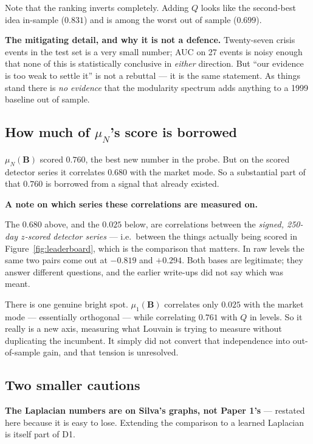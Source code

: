\documentclass[11pt,a4paper]{article}
\newcommand{\Q}{Q}
\newcommand{\Bmat}{\mathbf{B}}
\newenvironment{aside}[1]
 {\par\vspace{2.5mm}\begin{lrbox}{\asidebox}%
  \begin{minipage}{\dimexpr\textwidth-16pt\relax}\small\textbf{#1}\par\vspace{1mm}}
 {\end{minipage}\end{lrbox}%
  \noindent\setlength{\fboxsep}{7pt}\setlength{\fboxrule}{.4pt}%
  \fcolorbox{Rule}{Panel2}{\usebox{\asidebox}}\par\vspace{2.5mm}}
\begin{document}
Note that the ranking inverts completely. Adding $\Q$ looks like the second-best
idea in-sample ($0.831$) and is among the worst out of sample ($0.699$).

\textbf{The mitigating detail, and why it is not a defence.} Twenty-seven crisis
events in the test set is a very small number; AUC on 27 events is noisy enough
that none of this is statistically conclusive in \emph{either} direction. But
``our evidence is too weak to settle it'' is not a rebuttal --- it is the same
statement. As things stand there is \emph{no evidence} that the modularity
spectrum adds anything to a 1999 baseline out of sample.

\subsection{How much of \texorpdfstring{$\mu_N$}{mu\_N}'s score is borrowed}

$\mu_N(\Bmat)$ scored $0.760$, the best new number in the probe. But on the
scored detector series it correlates $0.680$ with the market mode. So a
substantial part of that $0.760$ is borrowed from a signal that already existed.

\begin{aside}{A note on which series these correlations are measured on.}
The $0.680$ above, and the $0.025$ below, are correlations between the
\emph{signed, 250-day $z$-scored detector series} --- i.e.\ between the things
actually being scored in Figure~\ref{fig:leaderboard}, which is the comparison
that matters. In raw levels the same two pairs come out at $-0.819$ and
$+0.294$. Both bases are legitimate; they answer different questions, and the
earlier write-ups did not say which was meant.
\end{aside}

\noindent There is one genuine bright spot. $\mu_1(\Bmat)$ correlates only
$\mathbf{0.025}$ with the market mode --- essentially orthogonal --- while
correlating $0.761$ with $\Q$ in levels. So it really is a new axis, measuring
what Louvain is trying to measure without duplicating the incumbent. It simply
did not convert that independence into out-of-sample gain, and that tension is
unresolved.

\subsection{Two smaller cautions}

\textbf{The Laplacian numbers are on Silva's graphs, not Paper 1's} --- restated
here because it is easy to lose. Extending the comparison to a learned Laplacian
is itself part of D1.
\end{document}
